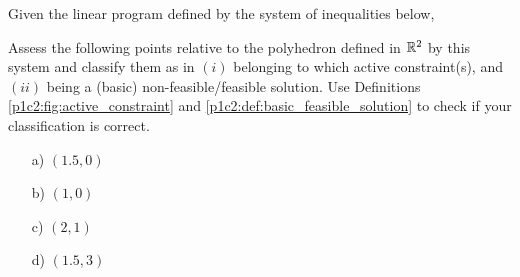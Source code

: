 Given the linear program defined by the system of inequalities below,
%
%
Assess the following points relative to the polyhedron defined in $\mathbb{R}^2$ by this system and classify them as in $(i)$ belonging to which active constraint(s), and $(ii)$ being a (basic) non-feasible/feasible solution. Use Definitions \ref{p1c2:fig:active_constraint} and \ref{p1c2:def:basic_feasible_solution} to check if your classification is correct.

\begin{itemize}
	\item[a)] $(1.5,0)$
	\item[b)] $(1,0)$
	\item[c)] $(2,1)$
	\item[d)] $(1.5,3)$
\end{itemize}